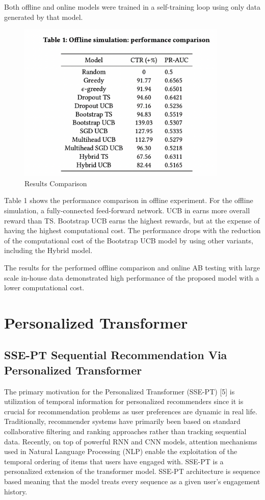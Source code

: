 Both offline and online models were trained in a self-training loop using only data generated by that model. 

\begin{figure}[hh!]
    \centering
    \includegraphics[width=100mm]{bandits_results.png}
    \caption{Results Comparison
    \label{overflow}}
\end{figure}

Table 1 shows the performance comparison in offline experiment. For the offline simulation, a fully-connected feed-forward network.  UCB in earns more overall reward than TS. Bootstrap UCB earns the highest rewards, but at the expense of having the highest computational cost. The performance drops with the reduction of
the computational cost of the Bootstrap UCB model by using other
variants, including the Hybrid model.

The results for the performed offline comparison
and online AB testing with large scale in-house data demonstrated high performance of the proposed model with a lower computational
cost. 

\chapter{Personalized Transformer}
\section{SSE-PT Sequential Recommendation Via Personalized Transformer}

The primary motivation for the Personalized Transformer (SSE-PT) [5] is utilization of temporal information for personalized recommenders since it is crucial for recommendation problems as user preferences are dynamic in real life. Traditionally, recommender systems have primarily been based on standard collaborative filtering and ranking approaches rather than tracking sequential data. Recently, on top of powerful RNN and CNN models, attention mechanisms used in Natural Language Processing (NLP) enable the exploitation of the temporal ordering of items that users have engaged with. SSE-PT is a personalized extension of the transformer model. SSE-PT architecture is sequence based meaning that the model treats every sequence  as a given user's engagement history.

